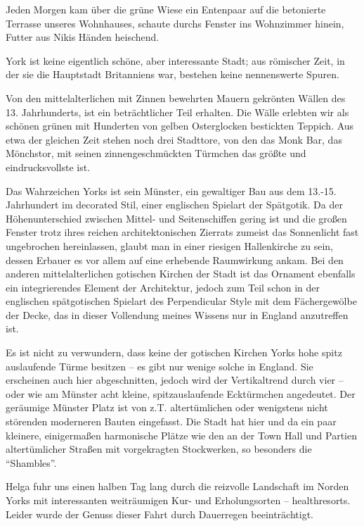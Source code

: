 Jeden Morgen kam über die grüne Wiese ein Entenpaar auf die betonierte Terrasse unseres Wohnhauses, schaute durchs Fenster ins Wohnzimmer hinein, Futter aus Nikis Händen heischend.

York ist keine eigentlich schöne, aber interessante Stadt; aus römischer Zeit, in der sie die Hauptstadt Britanniens war, bestehen keine nennenswerte Spuren.

Von den mittelalterlichen mit Zinnen bewehrten Mauern gekrönten Wällen des 13. Jahrhunderts, ist ein beträchtlicher Teil erhalten. Die Wälle erlebten wir als schönen grünen mit Hunderten von gelben Osterglocken bestickten Teppich. Aus etwa der gleichen Zeit stehen noch drei Stadttore, von den das Monk Bar, das Mönchstor, mit seinen zinnengeschmückten Türmchen das größte und eindrucksvollste ist.

Das Wahrzeichen Yorks ist sein Münster, ein gewaltiger Bau aus dem 13.-15. Jahrhundert im decorated Stil, einer englischen Spielart der Spätgotik. Da der Höhenunterschied zwischen Mittel- und Seitenschiffen gering ist und die großen Fenster trotz ihres reichen architektonischen Zierrats zumeist das Sonnenlicht fast ungebrochen hereinlassen, glaubt man in einer riesigen Hallenkirche zu sein, dessen Erbauer es vor allem auf eine erhebende Raumwirkung ankam. Bei den anderen mittelalterlichen gotischen Kirchen der Stadt ist das Ornament ebenfalls ein integrierendes Element der Architektur, jedoch zum Teil schon in der englischen spätgotischen Spielart des Perpendicular Style mit dem Fächergewölbe der Decke, das in dieser Vollendung meines Wissens nur in England anzutreffen ist.

Es ist nicht zu verwundern, dass keine der gotischen Kirchen Yorks hohe spitz auslaufende Türme besitzen -- es gibt nur wenige solche in England. Sie erscheinen auch hier abgeschnitten, jedoch wird der Vertikaltrend durch vier -- oder wie am Münster acht kleine, spitzauslaufende Ecktürmchen angedeutet. Der geräumige Münster Platz ist von z.T. altertümlichen oder wenigstens nicht störenden moderneren Bauten eingefasst. Die Stadt hat hier und da ein paar kleinere, einigermaßen harmonische Plätze wie den an der Town Hall und Partien altertümlicher Straßen mit vorgekragten Stockwerken, so besonders die \enquote{Shambles}.

Helga fuhr uns einen halben Tag lang durch die reizvolle Landschaft im Norden Yorks mit interessanten weiträumigen Kur- und Erholungsorten -- healthresorts. Leider wurde der Genuss dieser Fahrt durch Dauerregen beeinträchtigt.

